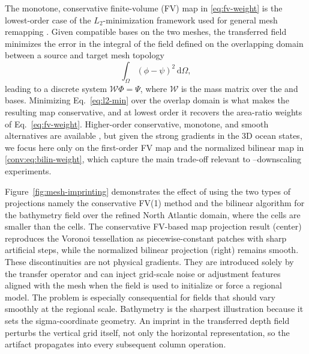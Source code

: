 The monotone, conservative finite-volume (FV) map in \eqref{eq:fv-weight} is the lowest-order case of the \(L_2\)-minimization framework used for general mesh remapping \citep{ullrich2015arbitrary,ullrich2016tempestremap}. Given compatible bases on the two meshes, the transferred field minimizes the error in the integral of the field defined on the overlapping domain between a source and target mesh topology
\begin{equation}
	\int_{\Omega}(\phi-\psi)^2\,\mathrm{d}\Omega ,
	\label{eq:l2-min}
\end{equation}
leading to a discrete system $\mathcal{W}\Phi=\Psi$, where $\mathcal{W}$ is the mass matrix over the \ROMS and \MPAS bases. Minimizing Eq.~\eqref{eq:l2-min} over the overlap domain is what makes the resulting map conservative, and at lowest order it recovers the area-ratio weights of Eq.~\eqref{eq:fv-weight}. Higher-order conservative, monotone, and smooth alternatives are available \citep{lauritzen2008monotone,lee1997mba}, but given the strong gradients in the 3D ocean states, we focus here only on the first-order FV map and the normalized bilinear map in \eqref{conv:eq:bilin-weight}, which capture the main trade-off relevant to \MPAS--\ROMS downscaling experiments.
%


%

Figure~\ref{fig:mesh-imprinting} demonstrates the effect of using the two types of projections namely the conservative FV(1) method and the bilinear algorithm for the bathymetry field over the refined North Atlantic domain, where the \ROMS cells are smaller than the \MPAS cells. The conservative FV-based map projection result (center) reproduces the \MPAS Voronoi tessellation as piecewise-constant patches with sharp artificial steps, while the normalized bilinear projection (right) remains smooth.
%
These discontinuities are not physical gradients. They are introduced solely by the transfer operator and can inject grid-scale noise or adjustment features aligned with the \MPAS mesh when the field is used to initialize or force a regional model. The problem is especially consequential for fields that should vary smoothly at the regional scale. Bathymetry is the sharpest illustration because it sets the \ROMS sigma-coordinate geometry. An imprint in the transferred depth field perturbs the vertical grid itself, not only the horizontal representation, so the artifact propagates into every subsequent column operation.

